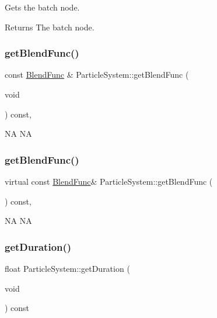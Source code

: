 Gets the batch node.

\begin{DoxyReturn}{Returns}
The batch node. 
\end{DoxyReturn}
\mbox{\label{classParticleSystem_aa4d6c0b820b3cfabff92f1e23c77e96f}} 
\subsubsection{\texorpdfstring{get\+Blend\+Func()}{getBlendFunc()}\hspace{0.1cm}{\footnotesize\ttfamily [1/2]}}
{\footnotesize\ttfamily const \hyperlink{structBlendFunc}{Blend\+Func} \& Particle\+System\+::get\+Blend\+Func (\begin{DoxyParamCaption}\item[{void}]{ }\end{DoxyParamCaption}) const\hspace{0.3cm}{\ttfamily [override]}, {\ttfamily [virtual]}}

NA  NA \mbox{\label{classParticleSystem_aa34df627c4e7fdc9f0b76713afd77b96}} 
\subsubsection{\texorpdfstring{get\+Blend\+Func()}{getBlendFunc()}\hspace{0.1cm}{\footnotesize\ttfamily [2/2]}}
{\footnotesize\ttfamily virtual const \hyperlink{structBlendFunc}{Blend\+Func}\& Particle\+System\+::get\+Blend\+Func (\begin{DoxyParamCaption}{ }\end{DoxyParamCaption}) const\hspace{0.3cm}{\ttfamily [override]}, {\ttfamily [virtual]}}

NA  NA \mbox{\label{classParticleSystem_a6d8eb072c8670ee64381e6dbdb691070}} 
\subsubsection{\texorpdfstring{get\+Duration()}{getDuration()}\hspace{0.1cm}{\footnotesize\ttfamily [1/2]}}
{\footnotesize\ttfamily float Particle\+System\+::get\+Duration (\begin{DoxyParamCaption}\item[{void}]{ }\end{DoxyParamCaption}) const\hspace{0.3cm}{\ttfamily [inline]}}

